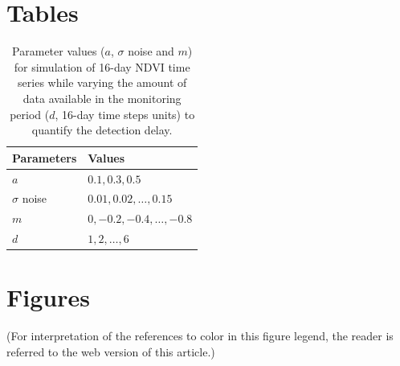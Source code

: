 \documentclass[authoryear,preprint,review,10pt]{elsarticle}
\begin{document}


\newpage

\section*{Tables}

\begin{table}[htb]
\caption{Parameter values ($a$, $\sigma$ noise and $m$) for simulation of 16-day NDVI time series while varying the amount of data available in the monitoring period ($d$, 16-day time steps units) to quantify the detection delay.}
\centering
\begin{tabular}{ll}
  \hline
  Parameters & Values \\ [0.5ex]
  \hline
  $a$         & $0.1, 0.3, 0.5$ \\
  $\sigma$ noise    & $0.01,0.02,\dots,0.15$ \\
  $m$         & $0, -0.2, -0.4, \dots, -0.8$ \\
  $d$   & $1, 2, \dots, 6$ \\ [.5ex]
  \hline
\end{tabular}
\label{table:simpar}
\end{table}

\newpage

\section*{Figures}

 (For interpretation of the references to color in this figure legend, the reader is referred to the web
 version of this article.)
\end{document}
